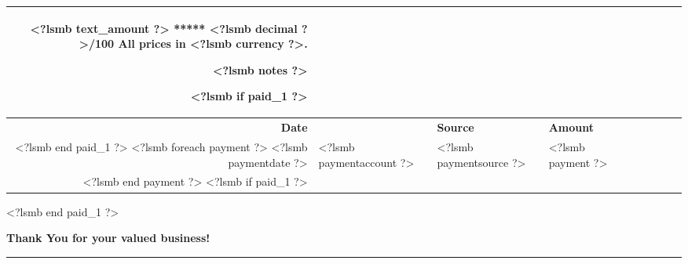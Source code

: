 \documentclass{scrartcl}
\begin{document}
\begin{tabularx}{\textwidth}{@{}rlXlrlrrr@{}}
{\vspace{0.3cm}

<?lsmb text_amount ?> ***** <?lsmb decimal ?>/100
\hfill
All prices in \textbf{<?lsmb currency ?>}.

\vspace{12pt}

<?lsmb notes ?>
}

\vfill

<?lsmb if paid_1 ?>
\begin{tabularx}{10cm}{@{}lXlr@{}}
  \textbf{Payments} & & & \\
  \hline
  \textbf{Date} & & \textbf{Source} & \textbf{Amount} \\
<?lsmb end paid_1 ?>
<?lsmb foreach payment ?>
  <?lsmb paymentdate ?> & <?lsmb paymentaccount ?> & <?lsmb paymentsource ?> & <?lsmb payment ?> \\
<?lsmb end payment ?>
<?lsmb if paid_1 ?>
\end{tabularx}
<?lsmb end paid_1 ?>

\vspace{1cm}

\centerline{\textbf{Thank You for your valued business!}}

\rule{\textwidth}{0.5pt}

\usebox{\ftr}
\end{document}

